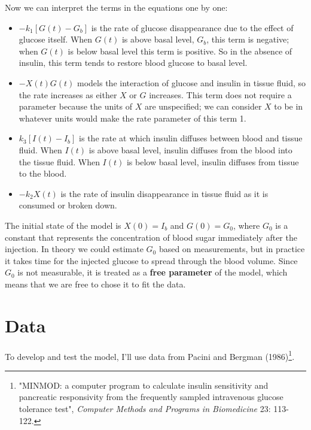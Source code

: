 \documentclass[12pt]{book}
\theoremstyle{exercise}
\begin{document}
Now we can interpret the terms in the equations one by one:

\begin{itemize}

\item $-k_1 \left[ G(t) - G_b \right]$ is the rate of glucose disappearance due to the effect of glucose itself.  When $G(t)$ is above basal level, $G_b$, this term is negative; when $G(t)$ is below basal level this term is positive.  So in the absence of insulin, this term tends to restore blood glucose to basal level.

\item $-X(t) G(t)$ models the interaction of glucose and insulin in tissue fluid, so the rate increases as either $X$ or $G$ increases.  This term does not require a parameter because the units of $X$ are unspecified; we can consider $X$ to be in whatever units would make the rate parameter of this term 1.

\item $k_3 \left[ I(t) - I_b \right]$ is the rate at which insulin diffuses between blood and tissue fluid.  When $I(t)$ is above basal level, insulin diffuses from the blood into the tissue fluid.  When $I(t)$ is below basal level, insulin diffuses from tissue to the blood.

\item $-k_2 X(t)$ is the rate of insulin disappearance in tissue fluid as it is consumed or broken down.

\end{itemize}

The initial state of the model is $X(0) = I_b$ and $G(0) = G_0$, where $G_0$ is a constant that represents the concentration of blood sugar immediately after the injection.  In theory we could estimate $G_0$ based on measurements, but in practice it takes time for the injected glucose to spread through the blood volume.  Since $G_0$ is not measurable, it is treated as a {\bf free parameter} of the model, which means that we are free to chose it to fit the data.

\section{Data}

To develop and test the model, I'll use data from Pacini and Bergman (1986)\footnote{"MINMOD: a computer program to calculate insulin sensitivity and pancreatic responsivity from the frequently sampled intravenous glucose tolerance test", {\em Computer Methods and Programs in Biomedicine} 23: 113-122.}.
\end{document}
